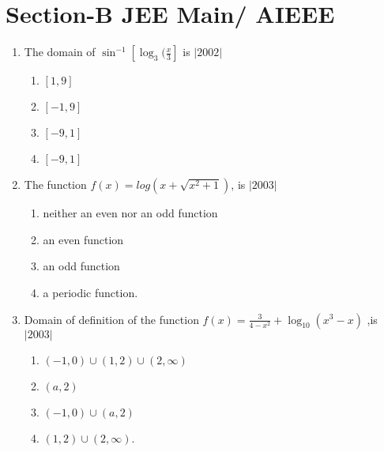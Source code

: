 \documentclass[journal,12pt,twocolumn]{IEEEtran}
\theoremstyle{remark}
\begin{document}
   \section*{Section-B JEE Main/ AIEEE}
	  \begin{enumerate}
		  \item The domain of $\sin^{-1}[\log_3(\frac{x}{3}]$ is 
			  \hfill$|2002|$
			  \begin{enumerate}
		  \item $[1,9]$    
		  \item $[-1,9]$    
		  \item $[-9,1]$     
		  \item $[-9,1]$
			  \end{enumerate}
		  \item The function $f(x)=log(x+\sqrt{x^2+1})$, is 
			  \hfill$|2003|$
			  \begin{enumerate}[label=(\alph*)]
		  \item neither an even nor an odd function
		  \item an even function
		  \item an odd function
		  \item a periodic function.
			  \end{enumerate}
		  \item Domain of definition of the function $f(x)=\frac{3}{4-x^2}+\log_{10}(x^3-x)$ ,is 
			  \hfill$|2003|$
			  \begin{enumerate}[label=(\alph*)]
		  \item $(-1,0)\cup(1,2)\cup(2,\infty)$     
		  \item $(a,2)$
		  \item $(-1,0)\cup(a,2)$                   
		  \item $(1,2)\cup(2,\infty)$.
			  \end{enumerate}
	  \end{enumerate}
\end{document}
